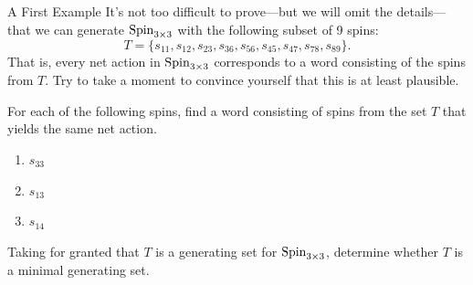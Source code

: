 \begin{section}{A First Example}
It's not too difficult to prove---but we will omit the details---that we can generate $\operatorname{Spin}_{3\times 3}$ with the following subset of 9 spins:
\[
T=\{s_{11}, s_{12}, s_{23}, s_{36}, s_{56}, s_{45}, s_{47}, s_{78}, s_{89}\}.
\]
That is, every net action in $\operatorname{Spin}_{3\times 3}$ corresponds to a word consisting of the spins from $T$.  Try to take a moment to convince yourself that this is at least plausible.  

\begin{problem}
For each of the following spins, find a word consisting of spins from the set $T$ that yields the same net action.
\begin{enumerate}[label=\textrm{(\alph*)}]
\item $s_{33}$
\item $s_{13}$
\item $s_{14}$
\end{enumerate}
\end{problem}

\begin{problem}
Taking for granted that $T$ is a generating set for $\operatorname{Spin}_{3\times 3}$, determine whether $T$ is a minimal generating set.
\end{problem}

\end{section}


